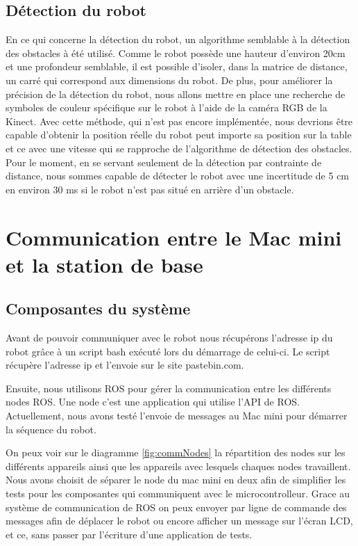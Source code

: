 \subsection{Détection du robot}
En ce qui concerne la détection du robot, un algorithme semblable à la détection des obstacles à été utilisé. Comme le robot possède une hauteur d'environ 20cm et une profondeur semblable, il est possible d'isoler, dans la matrice de distance, un carré qui correspond aux dimensions du robot. De plus, pour améliorer la précision de la détection du robot, nous allons mettre en place une recherche de symboles de couleur spécifique sur le robot à l'aide de la caméra RGB de la Kinect. Avec cette méthode, qui n'est pas encore implémentée, nous devrions être capable d'obtenir la position réelle du robot peut importe sa position sur la table et ce avec une vitesse qui se rapproche de l'algorithme de détection des obstacles. Pour le moment, en se servant seulement de la détection par contrainte de distance, nous sommes capable de détecter le robot avec une incertitude de 5 cm en environ 30 ms si le robot n'est pas situé en arrière d'un obstacle.

\section{Communication entre le Mac mini et la station de base}
\subsection{Composantes du système}
Avant de pouvoir communiquer avec le robot nous récupérons l’adresse ip du robot grâce à un script bash exécuté lors du démarrage de celui-ci. Le script récupère l’adresse ip et l’envoie sur le site pastebin.com.

Ensuite, nous utilisons ROS pour gérer la communication entre les différents nodes ROS. Une node c’est une application qui utilise l’API de ROS. Actuellement, nous avons testé l’envoie de messages au Mac mini pour démarrer la séquence du robot.

On peux voir sur le diagramme \ref{fig:commNodes} la répartition des nodes sur les différents appareils ainsi que les appareils avec lesquels chaques nodes travaillent. Nous avons choisit de séparer le node du mac mini en deux afin de simplifier les tests pour les composantes qui communiquent avec le microcontrolleur. Grace au système de communication de ROS on peux envoyer par ligne de commande des messages afin de déplacer le robot ou encore afficher un message sur l’écran LCD, et ce, sans passer par l’écriture d’une application de tests. 

